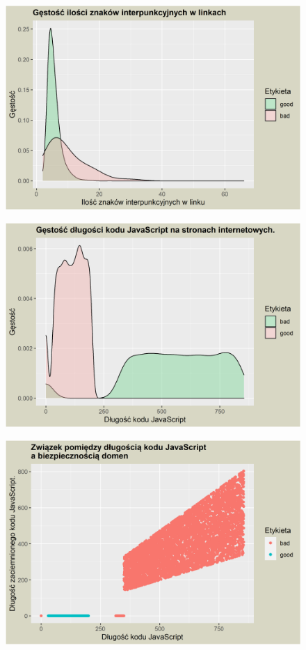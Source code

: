 \documentclass{beamer}
\begin{document}
\begin{frame}
	\begin{figure}
		\centering
		\includegraphics[width=1\linewidth]{../images/plot_7}
	\end{figure}
\end{frame}
\begin{frame}
	\begin{figure}
		\centering
		\includegraphics[width=1\linewidth]{../images/plot_6}
	\end{figure}
\end{frame}
\begin{frame}
	\begin{figure}
		\centering
		\includegraphics[width=0.9\linewidth]{../images/plot_8}
	\end{figure}
\end{frame}
\end{document}
